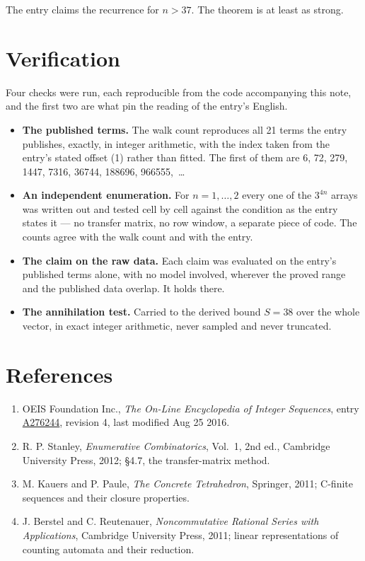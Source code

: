 \documentclass[11pt]{article}
\theoremstyle{definition}
\begin{document}
The entry claims the recurrence for $n > 37$. The theorem is at least as strong.

\section{Verification}

Four checks were run, each reproducible from the code accompanying this note, and the first two are what pin the reading of the entry's English.

\begin{itemize}

\item {\bfseries The published terms.} The walk count reproduces all 21 terms the entry publishes, exactly, in integer arithmetic, with the index taken from the entry's stated offset (1) rather than fitted. The first of them are 6, 72, 279, 1447, 7316, 36744, 188696, 966555,~\dots

\item {\bfseries An independent enumeration.} For $n = 1,\dots,2$ every one of the $3^{4n}$ arrays was written out and tested cell by cell against the condition as the entry states it --- no transfer matrix, no row window, a separate piece of code. The counts agree with the walk count and with the entry.

\item {\bfseries The claim on the raw data.} Each claim was evaluated on the entry's published terms alone, with no model involved, wherever the proved range and the published data overlap. It holds there.

\item {\bfseries The annihilation test.} Carried to the derived bound $S = 38$ over the whole vector, in exact integer arithmetic, never sampled and never truncated.

\end{itemize}

\section{References}

\begin{enumerate}

\item OEIS Foundation Inc., \emph{The On-Line Encyclopedia of Integer Sequences}, entry \href{https://oeis.org/A276244}{A276244}, revision 4, last modified Aug 25 2016.

\item R. P. Stanley, \emph{Enumerative Combinatorics}, Vol.~1, 2nd ed., Cambridge University Press, 2012; \S4.7, the transfer-matrix method.

\item M. Kauers and P. Paule, \emph{The Concrete Tetrahedron}, Springer, 2011; C-finite sequences and their closure properties.

\item J. Berstel and C. Reutenauer, \emph{Noncommutative Rational Series with Applications}, Cambridge University Press, 2011; linear representations of counting automata and their reduction.

\end{enumerate}
\end{document}
